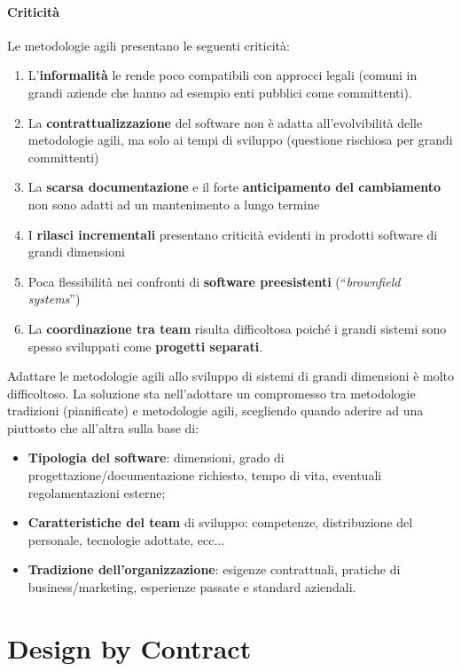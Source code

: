 \paragraph{Criticità} Le metodologie agili presentano le seguenti criticità:
\begin{enumerate}
    \item L'\textbf{informalità} le rende poco compatibili con approcci legali (comuni in grandi aziende che hanno ad esempio enti pubblici come committenti).
    \item La \textbf{contrattualizzazione} del software non è adatta all'evolvibilità delle metodologie agili, ma solo ai tempi di sviluppo (questione rischiosa per grandi committenti)
    \item La \textbf{scarsa documentazione} e il forte \textbf{anticipamento del cambiamento} non sono adatti ad un mantenimento a lungo termine
    \item I \textbf{rilasci incrementali} presentano criticità evidenti in prodotti software di grandi dimensioni
    \item Poca flessibilità nei confronti di \textbf{software preesistenti} (“\textit{brownfield systems}”)
    \item La \textbf{coordinazione tra team} risulta difficoltosa poiché i grandi sistemi sono spesso sviluppati come \textbf{progetti separati}.
\end{enumerate}

Adattare le metodologie agili allo sviluppo di sistemi di grandi dimensioni è molto difficoltoso. La soluzione sta nell'adottare un compromesso tra metodologie tradizioni (pianificate) e metodologie agili, scegliendo quando aderire ad una piuttosto che all'altra sulla base di:
\begin{itemize}
    \item \textbf{Tipologia del software}: dimensioni, grado di progettazione/documentazione richiesto, tempo di vita, eventuali regolamentazioni esterne;
    \item \textbf{Caratteristiche del team} di sviluppo: competenze, distribuzione del personale, tecnologie adottate, ecc...
    \item \textbf{Tradizione dell'organizzazione}: esigenze contrattuali, pratiche di business/marketing, esperienze passate e standard aziendali.
\end{itemize}

\newpage

\section{Design by Contract}

